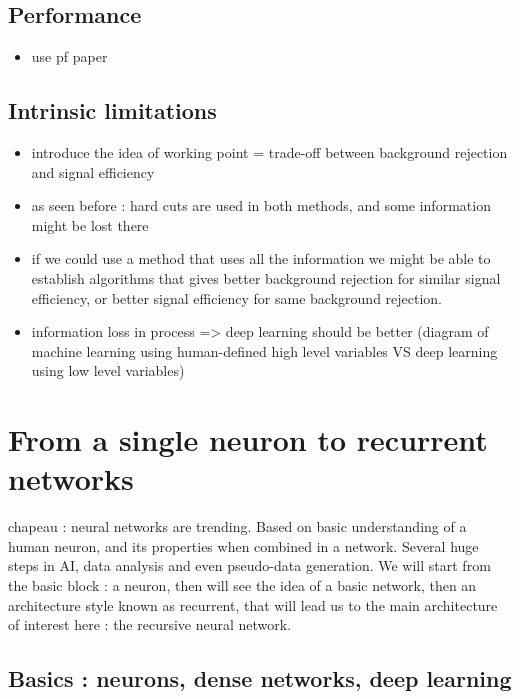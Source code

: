 \subsection{Performance}

\begin{itemize}
    \item use pf paper
\end{itemize}

\subsection{Intrinsic limitations}

\begin{itemize}
    \item introduce the idea of working point = trade-off between background rejection and signal efficiency
    \item as seen before : hard cuts are used in both methods, and some information might be lost there
    \item if we could use a method that uses all the information we might be able to establish algorithms that gives better background rejection for similar signal efficiency, or better signal efficiency for same background rejection.
    \item information loss in process => deep learning should be better (diagram of machine learning using human-defined high level variables VS deep learning using low level variables)

\end{itemize}


\section{From a single neuron to recurrent networks}
chapeau : neural networks are trending. Based on basic understanding of a human neuron, and its properties when combined in a network. Several huge steps in AI, data analysis and even pseudo-data generation. We will start from the basic block : a neuron, then will see the idea of a basic network, then an architecture style known as recurrent, that will lead us to the main architecture of interest here : the recursive neural network.

\subsection{Basics : neurons, dense networks, deep learning}

